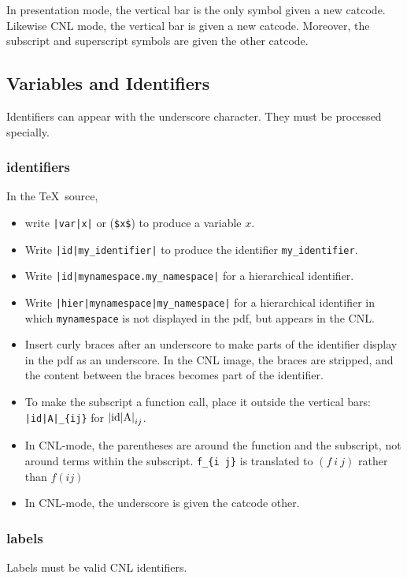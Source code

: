 \documentclass[12pt]{amsart}
\begin{document}
In presentation mode, the vertical bar is the only symbol given a new
catcode.  Likewise CNL mode, the vertical bar is given a new catcode.
Moreover, the subscript and superscript symbols are given the other catcode.

\subsection{Variables and Identifiers}

Identifiers can appear with the underscore character.  They must be
processed specially.

\subsubsection{identifiers}
In the \TeX\ source, 
\begin{itemize}
\item write \verb!|var|x|! or (\verb!$x$!) 
to produce a variable $x$.
\item Write \verb!|id|my_identifier|! to
produce the identifier \verb!my_identifier!.
\item Write \verb!|id|mynamespace.my_namespace|! for
a hierarchical identifier.
\item Write \verb!|hier|mynamespace|my_namespace|! for
a hierarchical identifier in which \verb!mynamespace! is
not displayed in the pdf, but appears in the CNL.
\item Insert curly braces after an underscore to make parts
of the identifier display in the pdf as an underscore.
In the CNL image, the braces are stripped, and the content
between the braces becomes part of the identifier.
\item To make the subscript a function call, place it outside
the vertical bars: \verb!|id|A|_{ij}! for $\hbox{|id|A|}_{ij}$.
\item In CNL-mode, the parentheses are around the function
and the subscript, not around terms within the subscript.
\verb!f_{i j}! is translated to $(f~i~j)$ rather than $f (i j)$
\item In CNL-mode, the underscore is given the catcode other.
\end{itemize}

\subsubsection{labels}

Labels must be valid CNL identifiers.
\end{document}
